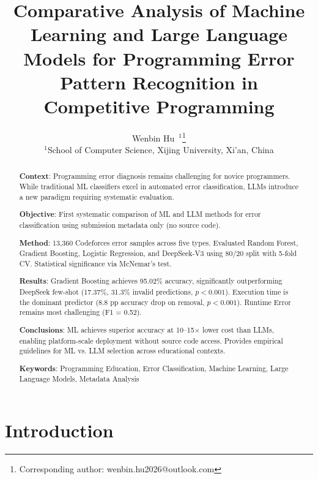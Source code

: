 \documentclass[10pt,a4paper]{article}
\title{Comparative Analysis of Machine Learning and Large Language Models
       for Programming Error Pattern Recognition in Competitive Programming}
\author{
    Wenbin Hu~$^{1}$\footnote{Corresponding author: wenbin.hu2026@outlook.com}
    \\
    \small $^{1}$School of Computer Science, Xijing University, Xi'an, China
}
\begin{document}
\maketitle

\begin{abstract}
\noindent\textbf{Context}: Programming error diagnosis remains challenging for novice programmers. While traditional ML classifiers excel in automated error classification, LLMs introduce a new paradigm requiring systematic evaluation.

\noindent\textbf{Objective}: First systematic comparison of ML and LLM methods for error classification using submission metadata only (no source code).

\noindent\textbf{Method}: 13,360 Codeforces error samples across five types. Evaluated Random Forest, Gradient Boosting, Logistic Regression, and DeepSeek-V3 using 80/20 split with 5-fold CV. Statistical significance via McNemar's test.

\noindent\textbf{Results}: Gradient Boosting achieves 95.02\% accuracy, significantly outperforming DeepSeek few-shot (17.37\%, 31.3\% invalid predictions, $p < 0.001$). Execution time is the dominant predictor (8.8 pp accuracy drop on removal, $p < 0.001$). Runtime Error remains most challenging (F1 = 0.52).

\noindent\textbf{Conclusions}: ML achieves superior accuracy at 10--15$\times$ lower cost than LLMs, enabling platform-scale deployment without source code access. Provides empirical guidelines for ML vs. LLM selection across educational contexts.

\noindent\textbf{Keywords}: Programming Education, Error Classification, Machine Learning, Large Language Models, Metadata Analysis
\end{abstract}

\section{Introduction}
\end{document}
